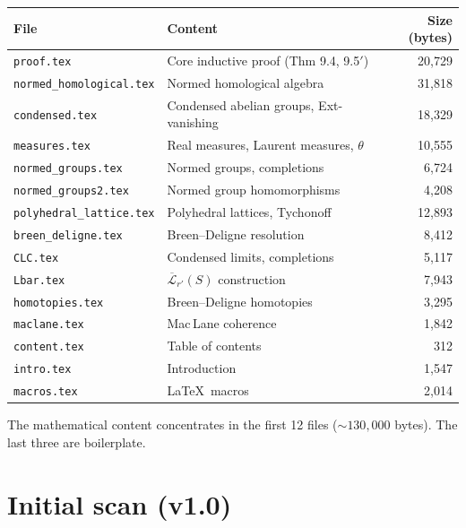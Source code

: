 \documentclass[11pt,a4paper]{article}
\theoremstyle{plain}
\theoremstyle{definition}
\begin{document}
\begin{center}
\small
\begin{tabular}{llr}
\toprule
\textbf{File} & \textbf{Content} & \textbf{Size (bytes)} \\
\midrule
\texttt{proof.tex}              & Core inductive proof (Thm 9.4, 9.5$'$) & 20{,}729 \\
\texttt{normed\_homological.tex} & Normed homological algebra             & 31{,}818 \\
\texttt{condensed.tex}          & Condensed abelian groups, Ext-vanishing & 18{,}329 \\
\texttt{measures.tex}           & Real measures, Laurent measures, $\theta$ & 10{,}555 \\
\texttt{normed\_groups.tex}     & Normed groups, completions              &  6{,}724 \\
\texttt{normed\_groups2.tex}    & Normed group homomorphisms              &  4{,}208 \\
\texttt{polyhedral\_lattice.tex} & Polyhedral lattices, Tychonoff         & 12{,}893 \\
\texttt{breen\_deligne.tex}     & Breen--Deligne resolution               &  8{,}412 \\
\texttt{CLC.tex}                & Condensed limits, completions           &  5{,}117 \\
\texttt{Lbar.tex}               & $\overline{\mathcal{L}}_{r'}(S)$ construction & 7{,}943 \\
\texttt{homotopies.tex}         & Breen--Deligne homotopies               &  3{,}295 \\
\texttt{maclane.tex}            & Mac\,Lane coherence                     &  1{,}842 \\
\texttt{content.tex}            & Table of contents                       &    312 \\
\texttt{intro.tex}              & Introduction                            &  1{,}547 \\
\texttt{macros.tex}             & \LaTeX\ macros                          &  2{,}014 \\
\bottomrule
\end{tabular}
\end{center}

The mathematical content concentrates in the first 12 files
(${\sim}130{,}000$ bytes).  The last three are boilerplate.


\section{Initial scan (v1.0)}\label{sec:initial-scan}
\end{document}
